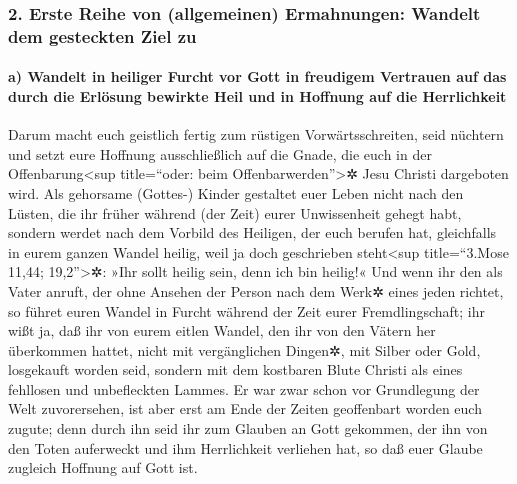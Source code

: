 \hypertarget{erste-reihe-von-allgemeinen-ermahnungen-wandelt-dem-gesteckten-ziel-zu}{%
\subsubsection{2. Erste Reihe von (allgemeinen) Ermahnungen: Wandelt dem
gesteckten Ziel
zu}\label{erste-reihe-von-allgemeinen-ermahnungen-wandelt-dem-gesteckten-ziel-zu}}

\hypertarget{a-wandelt-in-heiliger-furcht-vor-gott-in-freudigem-vertrauen-auf-das-durch-die-erluxf6sung-bewirkte-heil-und-in-hoffnung-auf-die-herrlichkeit}{%
\paragraph{a) Wandelt in heiliger Furcht vor Gott in freudigem Vertrauen
auf das durch die Erlösung bewirkte Heil und in Hoffnung auf die
Herrlichkeit}\label{a-wandelt-in-heiliger-furcht-vor-gott-in-freudigem-vertrauen-auf-das-durch-die-erluxf6sung-bewirkte-heil-und-in-hoffnung-auf-die-herrlichkeit}}

 Darum macht euch geistlich fertig zum rüstigen
Vorwärtsschreiten, seid nüchtern und setzt eure Hoffnung ausschließlich
auf die Gnade, die euch in der Offenbarung\textless sup title=``oder:
beim Offenbarwerden''\textgreater✲ Jesu Christi dargeboten wird.
 Als gehorsame (Gottes-) Kinder gestaltet euer Leben
nicht nach den Lüsten, die ihr früher während (der Zeit) eurer
Unwissenheit gehegt habt,  sondern werdet nach dem
Vorbild des Heiligen, der euch berufen hat, gleichfalls in eurem ganzen
Wandel heilig,  weil ja doch geschrieben
steht\textless sup title=``3.Mose 11,44; 19,2''\textgreater✲: »Ihr sollt
heilig sein, denn ich bin heilig!«  Und wenn ihr den als
Vater anruft, der ohne Ansehen der Person nach dem Werk✲ eines jeden
richtet, so führet euren Wandel in Furcht während der Zeit eurer
Fremdlingschaft;  ihr wißt ja, daß ihr von eurem eitlen
Wandel, den ihr von den Vätern her überkommen hattet, nicht mit
vergänglichen Dingen✲, mit Silber oder Gold, losgekauft worden seid,
 sondern mit dem kostbaren Blute Christi als eines
fehllosen und unbefleckten Lammes.  Er war zwar schon vor
Grundlegung der Welt zuvorersehen, ist aber erst am Ende der Zeiten
geoffenbart worden euch zugute;  denn durch ihn seid ihr
zum Glauben an Gott gekommen, der ihn von den Toten auferweckt und ihm
Herrlichkeit verliehen hat, so daß euer Glaube zugleich Hoffnung auf
Gott ist.

